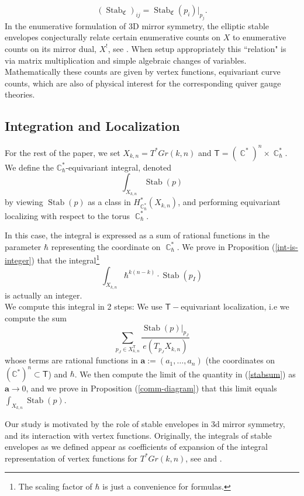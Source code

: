 \documentclass[12 pt]{article}
\theoremstyle{plain}
\theoremstyle{plain}
\theoremstyle{plain}
\theoremstyle{plain}
\theoremstyle{plain}
\theoremstyle{plain}
\theoremstyle{plain}
\theoremstyle{plain}
\theoremstyle{plain}
\theoremstyle{plain}
\theoremstyle{remark}
\theoremstyle{remark}
\theoremstyle{definition}
\theoremstyle{definition}
\theoremstyle{definition}
\theoremstyle{definition}
\theoremstyle{definition}
\theoremstyle{definition}
\DeclareMathOperator{\C}{\mathbb{C}}
\DeclareMathOperator{\Stab}{Stab}
\DeclareMathOperator{\stab}{\text{Stab}}
\newcommand{\bT}{\mathsf{T}}
\newcommand{\chamb}{\mathfrak{C}}
\begin{document}
$$
(\stab_\chamb)_{ij}=\stab_{\chamb}(p_i)\big|_{p_j}.
$$
In the enumerative formulation of 3D mirror symmetry, the elliptic stable envelopes conjecturally relate certain enumerative counts on $X$ to enumerative counts on its mirror dual, $X^!$, see \cite{AO}. When setup appropriately this ``relation" is via matrix multiplication and simple algebraic changes of variables. Mathematically these counts are given by vertex functions, equivariant curve counts, which are also of physical interest for the corresponding quiver gauge theories.

\subsection{Integration and Localization}

For the rest of the paper, we set $X_{k,n}=T^*Gr(k,n)$ and $\bT=(\C^*)^n\times\C^*_\hbar$. We define the $\mathbb{C}^{*}_{\hbar}$-equivariant integral, denoted
$$
\int_{X_{k,n}}\Stab(p)
$$
by viewing $\Stab(p)$ as a class in $H_{\C^*_\hbar}^*(X_{k,n})$, and performing equivariant localizing with respect to the torus $\C^*_\hbar$.

In this case, the integral is expressed as a sum of rational functions in the parameter $\hbar$ representing the coordinate on $\C^*_{\hbar}$. We prove in Proposition (\ref{int-is-integer}) that the integral\footnote{The scaling factor of $\hbar$ is just a convenience for formulas.}
$$
\int_{X_{k,n}}\hbar^{k(n-k)}\cdot \stab(p_I)
$$
is actually an integer.\\
We compute this integral in 2 steps: We use $\bT-$equivariant localization, i.e we compute the sum 
\begin{equation}\label{stabsum}
    \sum\limits_{p_{J}\in X_{k,n}^{\bT}}\frac{\stab(p)|_{p_{J}}}{e(T_{p_{J}}X_{k,n})}\end{equation}
whose terms are rational functions in $\mathbf{a}:=(a_{1},\dots,a_{n})$ (the coordinates on $(\mathbb{C}^{*})^{n}\subset\bT$) and $\hbar$. We then compute the limit of the quantity in (\ref{stabsum}) as $\textbf{a}\to 0$, and we prove in Proposition (\ref{comm-diagram}) that this limit equals $\int_{X_{k,n}}\stab(p)$. 

Our study is motivated by the role of stable envelopes in 3d mirror symmetry, and its interaction with vertex functions. Originally, the integrals of stable envelopes as we defined appear as coefficients of expansion of the integral representation of vertex functions for $T^{*}Gr(k,n)$, see \cite{SV2} and \cite{SV}. 
\end{document}
